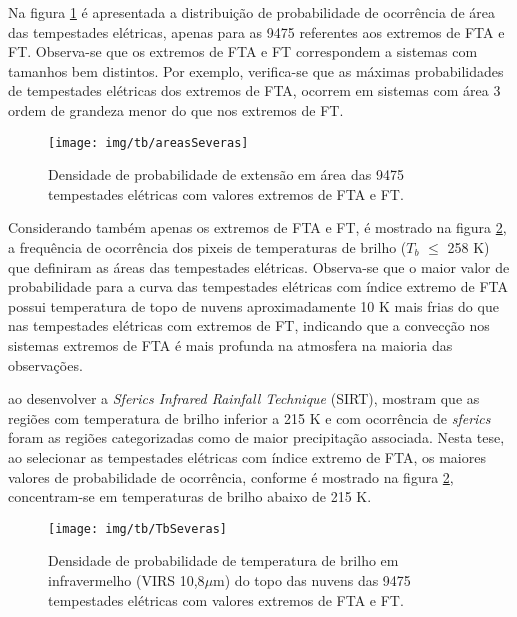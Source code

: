 Na figura \ref{size} é apresentada a distribuição de probabilidade de ocorrência de área das tempestades elétricas, apenas para as 9475 referentes aos extremos de FTA e FT. 
Observa-se que os extremos de FTA e FT correspondem a sistemas com tamanhos bem distintos. Por exemplo, verifica-se que as máximas probabilidades de tempestades elétricas dos extremos de FTA, ocorrem em sistemas com área 3 ordem de grandeza menor do que nos extremos de FT.


\begin{figure}[!ht]
  \centering
  \texttt{[image: img/tb/areasSeveras]}   
  \caption{Densidade de probabilidade de extensão em área das 9475 tempestades elétricas com valores extremos de FTA e FT.}
  \label{size}  
\end{figure}

Considerando também apenas os extremos de FTA e FT, é mostrado na figura \ref{tb}, a frequência de ocorrência dos pixeis de temperaturas de brilho ($T_b$ $\leq$ 258 K) que definiram as áreas das tempestades elétricas. Observa-se que o maior valor de probabilidade para a curva das tempestades elétricas com índice extremo de FTA possui temperatura de topo de nuvens aproximadamente 10 K mais frias do que nas tempestades elétricas com extremos de FT, indicando que a convecção nos sistemas extremos de FTA é mais profunda na atmosfera na maioria das observações.



 ao desenvolver a \textit{Sferics Infrared Rainfall Technique} (SIRT), mostram que as regiões com temperatura de brilho inferior a 215 K e com ocorrência de \textit{sferics} foram as regiões categorizadas como de maior precipitação associada. Nesta tese, ao selecionar as tempestades elétricas com índice extremo de FTA, os maiores valores de probabilidade de ocorrência, conforme é mostrado na figura \ref{tb}, concentram-se em temperaturas de brilho abaixo de 215 K.




\begin{figure}[!ht]
  \centering 
  \texttt{[image: img/tb/TbSeveras]}
  \caption{Densidade de probabilidade de temperatura de brilho em infravermelho (VIRS 10,8$\mu$m) do topo das nuvens das 9475 tempestades elétricas com valores extremos de FTA e FT.}
  \label{tb}
\end{figure}


